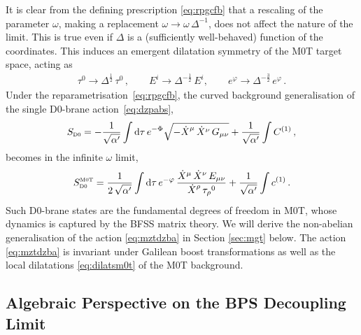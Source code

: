 \documentclass[11pt]{article}
\newcommand{\be}{\begin{equation}}
\newcommand{\ee}{\end{equation}}
\newcommand{\dd}{\mathrm{d}}
\begin{document}
It is clear from the defining prescription \eqref{eq:rpgcfb} that a rescaling of the parameter $\omega$, making a replacement   $\omega \rightarrow \omega \, \Delta^{-1}$, does not affect the nature of the limit.
This is true even if $\Delta$ is a (sufficiently well-behaved) function of the coordinates. 
This induces an emergent dilatation symmetry of the M0T target space, acting as 
%
\begin{align} \label{eq:dilatsm0t}
    \tau^0 \rightarrow \Delta^{\frac{1}{2}} \, \tau^0\,,
        \qquad%
    E^{i} \rightarrow \Delta^{-\frac{1}{2}} \, E^{i},
        \qquad%
    e^\varphi \rightarrow \Delta^{-\frac{3}{2}} \, e^\varphi\,.
\end{align}
%
Under the reparametrisation~\eqref{eq:rpgcfb}, the curved background generalisation of the single D0-brane action~\eqref{eq:dzpabs},
%
\be \label{eq:dzpabs0}
    S_\text{\scalebox{0.8}{D0}} = - \frac{1}{\sqrt{\alpha'}} \int \dd \tau \, e^{-\Phi} \sqrt{- \dot{X}^\mu_{\phantom{\dagger}} \, \dot{X}^\nu \, G_{\mu\nu}} + \frac{1}{\sqrt{\alpha'}} \int C^{(1)}\,,
\ee
%
becomes in the infinite $\omega$ limit,
\be \label{eq:mztdzba}
    S^\text{\scalebox{0.8}{M0T}}_\text{\scalebox{0.8}{D0}} = \frac{1}{2 \, \sqrt{\alpha'}} \int \dd\tau \, e^{-\varphi} \, \frac{\dot{X}^\mu \, \dot{X}^\nu \, E_{\mu\nu}}{\dot{X}^\rho_{\phantom{\dagger}} \, \tau_\rho{}^0} + \frac{1}{\sqrt{\alpha'}} \int c^{(1)}\,.
\ee
%
Such D0-brane states are the fundamental degrees of freedom in M0T, whose dynamics is captured by the BFSS matrix theory. 
We will derive the non-abelian generalisation of the action \eqref{eq:mztdzba} in Section \ref{sec:mgt} below. 
The action \eqref{eq:mztdzba} is invariant under Galilean boost transformations as well as the local dilatations \eqref{eq:dilatsm0t} of the M0T background.


\subsection{Algebraic Perspective on the BPS Decoupling Limit}
\label{sec:alg} 
\end{document}
